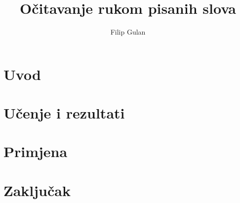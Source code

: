 \documentclass[times, utf8, seminar, numeric]{fer}
\begin{document}
\title{Očitavanje rukom pisanih slova}
\author{Filip Gulan}

\maketitle
\tableofcontents

\chapter{Uvod}


\chapter{Učenje i rezultati}


\chapter{Primjena}


\chapter{Zaključak}





\end{document}
